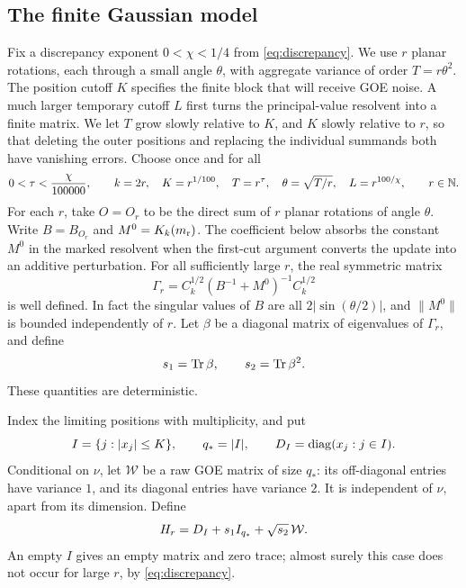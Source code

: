 \subsection{The finite Gaussian model}

Fix a discrepancy exponent \(0<\chi<1/4\) from
\eqref{eq:discrepancy}. We use \(r\) planar rotations, each through a
small angle \(\theta\), with aggregate variance of order
\(T=r\theta^2\). The position cutoff \(K\) specifies the finite block
that will receive GOE noise. A much larger temporary cutoff \(L\)
first turns the principal-value resolvent into a finite matrix.
We let \(T\) grow slowly relative to \(K\), and \(K\) slowly relative
to \(r\), so that deleting the outer positions and replacing the
individual summands both have vanishing errors. Choose once and for all
\begin{equation}\label{eq:sw-parameters}
 0<\tau<\frac{\chi}{100000},\qquad
 k=2r,\quad K=r^{1/100},\quad T=r^\tau,\quad
 \theta=\sqrt{T/r},\quad L=r^{100/\chi},
 \qquad r\in\mathbb N.
\end{equation}
For each \(r\), take \(O=O_r\) to be the direct sum of \(r\) planar rotations
of angle \(\theta\). Write \(B=B_{O_r}\) and \(M^0=K_k(m_{\rm r})\).
The coefficient below absorbs the constant \(M^0\) in the marked
resolvent when the first-cut argument converts the update into an
additive perturbation.
For all sufficiently large \(r\), the real symmetric matrix
\begin{equation}\label{eq:sw-coefficient}
 \Gamma_r=C_k^{1/2}(B^{-1}+M^0)^{-1}C_k^{1/2}
\end{equation}
is well defined. In fact the singular values of \(B\) are all
\(2|\sin(\theta/2)|\), and \(\|M^0\|\) is bounded independently of \(r\).
Let \(\beta\) be a diagonal matrix of eigenvalues of \(\Gamma_r\), and define
\begin{equation}\label{eq:sw-moments}
 s_1=\operatorname{Tr}\beta,\qquad s_2=\operatorname{Tr}\beta^2.
\end{equation}
These quantities are deterministic.

Index the limiting positions with multiplicity, and put
\[
 I=\{j:|x_j|\le K\},\qquad q_*=|I|,\qquad
 D_I=\operatorname{diag}(x_j:j\in I).
\]
Conditional on \(\nu\), let \(\mathcal W\) be a raw GOE matrix of size \(q_*\):
its off-diagonal entries have variance \(1\), and its diagonal entries have
variance \(2\). It is independent of \(\nu\), apart from its dimension. Define
\begin{equation}\label{eq:sw-inserted-matrix}
 H_r=D_I+s_1I_{q_*}+\sqrt{s_2}\,\mathcal W.
\end{equation}
An empty \(I\) gives an empty matrix and zero trace; almost surely this case
does not occur for large \(r\), by \eqref{eq:discrepancy}.

